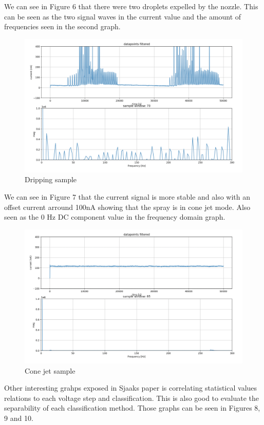     We can see in Figure 6 that there were two droplets expelled by the nozzle. This can be seen as the two signal waves in the current value and the amount of frequencies seen in the second graph.

    \begin{figure}[H]
        \center
        \includegraphics[width=12cm]{images/images_folder_2/img2.png}
        \caption{Dripping sample}
    \end{figure}

    We can see in Figure 7 that the current signal is more stable and also with an offset current arround 100nA showing that the spray is in cone jet mode. Also seen as the 0 Hz DC component value in the frequency domain graph.


    \begin{figure}[H]
        \center
        \includegraphics[width=12cm]{images/images_folder_2/img3.png}
        \caption{Cone jet sample}
    \end{figure}

    Other interesting grahps exposed in Sjaaks\cite*[]{Sjaaks} paper is correlating statistical values relations to each voltage step and classification. This is also good to evaluate the separability of each classification method.
    Those graphs can be seen in Figures 8, 9 and 10.

